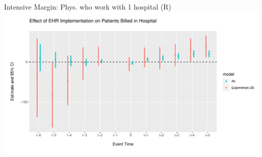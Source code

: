 \documentclass[10pt]{beamer}
\begin{document}
\begin{frame}{Intensive Margin: Phys. who work with 1 hospital (R)}
\centering
\includegraphics[scale=.45]{Objects/event_hosp_plot.pdf}
\end{frame}
\end{document}

